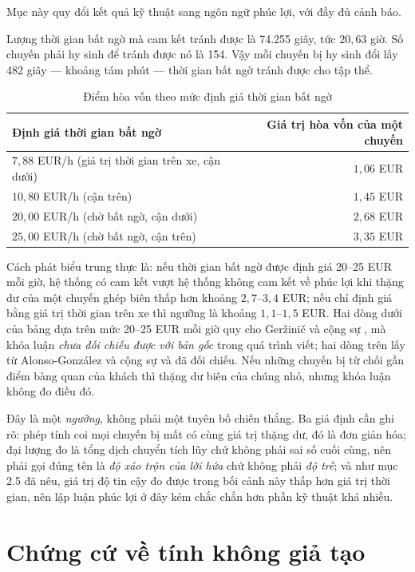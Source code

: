 Mục này quy đổi kết quả kỹ thuật sang ngôn ngữ phúc lợi, với đầy đủ cảnh báo.

Lượng thời gian bất ngờ mà cam kết tránh được là 74.255 giây, tức $20{,}63$ giờ. Số chuyến phải
hy sinh để tránh được nó là 154. Vậy mỗi chuyến bị hy sinh đổi lấy 482 giây --- khoảng tám phút
--- thời gian bất ngờ tránh được cho tập thể.

\begin{table}[htbp]
\centering
\caption{Điểm hòa vốn theo mức định giá thời gian bất ngờ}
\label{bang:hoavon}
\small
\begin{tabular}{@{}lr@{}}
\toprule
\textbf{Định giá thời gian bất ngờ} & \textbf{Giá trị hòa vốn của một chuyến}\\
\midrule
$7{,}88$ EUR/h (giá trị thời gian trên xe, cận dưới) & $1{,}06$ EUR\\
$10{,}80$ EUR/h (cận trên) & $1{,}45$ EUR\\
$20{,}00$ EUR/h (chờ bất ngờ, cận dưới) & $2{,}68$ EUR\\
$25{,}00$ EUR/h (chờ bất ngờ, cận trên) & $3{,}35$ EUR\\
\bottomrule
\end{tabular}
\end{table}

Cách phát biểu trung thực là: nếu thời gian bất ngờ được định giá 20--25 EUR mỗi giờ, hệ thống có
cam kết vượt hệ thống không cam kết về phúc lợi khi thặng dư của một chuyến ghép biên thấp hơn
khoảng $2{,}7$--$3{,}4$ EUR; nếu chỉ định giá bằng giá trị thời gian trên xe thì ngưỡng là khoảng
$1{,}1$--$1{,}5$ EUR. Hai dòng dưới của bảng dựa trên mức 20--25 EUR mỗi giờ quy cho Geržinič và
cộng sự \cite{gerzinic2023}, mà khóa luận \emph{chưa đối chiếu được với bản gốc} trong quá trình
viết; hai dòng trên lấy từ Alonso-González và cộng sự \cite{alonsogonzalez2020} và đã đối chiếu. Nếu những
chuyến bị từ chối gần điểm bàng quan của khách thì thặng dư biên của chúng nhỏ, nhưng khóa luận
không đo điều đó.

Đây là một \emph{ngưỡng}, không phải một tuyên bố chiến thắng. Ba giả định cần ghi rõ: phép tính
coi mọi chuyến bị mất có cùng giá trị thặng dư, đó là đơn giản hóa; đại lượng đo là tổng dịch
chuyển tích lũy chứ không phải sai số cuối cùng, nên phải gọi đúng tên là \emph{độ xáo trộn của
lời hứa} chứ không phải \emph{độ trễ}; và như mục 2.5 đã nêu, giá trị độ tin cậy đo được trong
bối cảnh này thấp hơn giá trị thời gian, nên lập luận phúc lợi ở đây kém chắc chắn hơn phần kỹ
thuật khá nhiều.

\section{Chứng cứ về tính không giả tạo}
\label{muc:chungcu}

